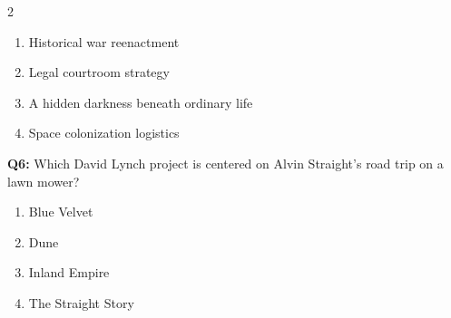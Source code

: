\documentclass[10pt]{article}
\begin{document}
\begin{multicols}{2}
\begin{enumerate}[label=\arabic*.]
\item Historical war reenactment
\item Legal courtroom strategy
\item A hidden darkness beneath ordinary life
\item Space colonization logistics
\end{enumerate}
\textbf{Q6:} Which David Lynch project is centered on Alvin Straight's road trip on a lawn mower?

\begin{enumerate}[label=\arabic*.]
\item Blue Velvet
\item Dune
\item Inland Empire
\item The Straight Story
\end{enumerate}
\end{multicols}

\newpage
\end{document}
